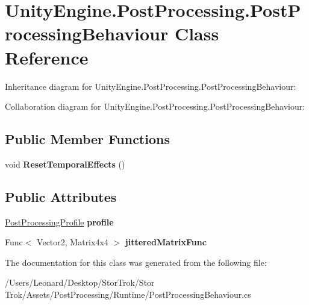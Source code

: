 \hypertarget{class_unity_engine_1_1_post_processing_1_1_post_processing_behaviour}{}\section{Unity\+Engine.\+Post\+Processing.\+Post\+Processing\+Behaviour Class Reference}
\label{class_unity_engine_1_1_post_processing_1_1_post_processing_behaviour}


Inheritance diagram for Unity\+Engine.\+Post\+Processing.\+Post\+Processing\+Behaviour\+:


Collaboration diagram for Unity\+Engine.\+Post\+Processing.\+Post\+Processing\+Behaviour\+:
\subsection*{Public Member Functions}
\begin{DoxyCompactItemize}
\item 
\mbox{\label{class_unity_engine_1_1_post_processing_1_1_post_processing_behaviour_a12cc91b85fedc39bf7d777a2c4d49f17}} 
void {\bfseries Reset\+Temporal\+Effects} ()
\end{DoxyCompactItemize}
\subsection*{Public Attributes}
\begin{DoxyCompactItemize}
\item 
\mbox{\label{class_unity_engine_1_1_post_processing_1_1_post_processing_behaviour_a34c4569526dd0e87af574653c99ab1db}} 
\hyperlink{class_unity_engine_1_1_post_processing_1_1_post_processing_profile}{Post\+Processing\+Profile} {\bfseries profile}
\item 
\mbox{\label{class_unity_engine_1_1_post_processing_1_1_post_processing_behaviour_a8cd98b27f5b575670763aeca458e2547}} 
Func$<$ Vector2, Matrix4x4 $>$ {\bfseries jittered\+Matrix\+Func}
\end{DoxyCompactItemize}


The documentation for this class was generated from the following file\+:\begin{DoxyCompactItemize}
\item 
/\+Users/\+Leonard/\+Desktop/\+Stor\+Trok/\+Stor Trok/\+Assets/\+Post\+Processing/\+Runtime/Post\+Processing\+Behaviour.\+cs\end{DoxyCompactItemize}
